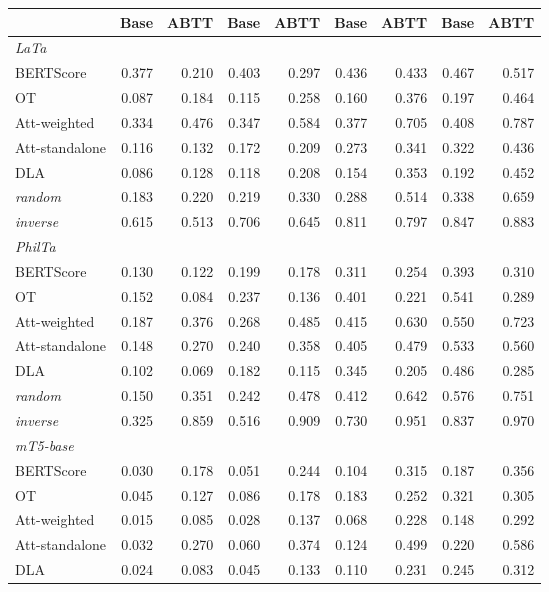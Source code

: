 \begin{table}[t]
\begin{tabular}{lrrrrrrrr}
\cmidrule(lr){2-3} \cmidrule(lr){4-5} \cmidrule(lr){6-7} \cmidrule(lr){8-9}
 & Base & ABTT & Base & ABTT & Base & ABTT & Base & ABTT \\
\midrule
\multicolumn{9}{l}{\emph{LaTa}} \\
BERTScore & 0.377 & 0.210 & 0.403 & 0.297 & 0.436 & 0.433 & 0.467 & 0.517 \\
OT & 0.087 & 0.184 & 0.115 & 0.258 & 0.160 & 0.376 & 0.197 & 0.464 \\
Att-weighted & 0.334 & 0.476 & 0.347 & 0.584 & 0.377 & 0.705 & 0.408 & 0.787 \\
Att-standalone & 0.116 & 0.132 & 0.172 & 0.209 & 0.273 & 0.341 & 0.322 & 0.436 \\
DLA & 0.086 & 0.128 & 0.118 & 0.208 & 0.154 & 0.353 & 0.192 & 0.452 \\
\textit{random} & 0.183 & 0.220 & 0.219 & 0.330 & 0.288 & 0.514 & 0.338 & 0.659 \\
\textit{inverse} & 0.615 & 0.513 & 0.706 & 0.645 & 0.811 & 0.797 & 0.847 & 0.883 \\
\midrule
\multicolumn{9}{l}{\emph{PhilTa}} \\
BERTScore & 0.130 & 0.122 & 0.199 & 0.178 & 0.311 & 0.254 & 0.393 & 0.310 \\
OT & 0.152 & 0.084 & 0.237 & 0.136 & 0.401 & 0.221 & 0.541 & 0.289 \\
Att-weighted & 0.187 & 0.376 & 0.268 & 0.485 & 0.415 & 0.630 & 0.550 & 0.723 \\
Att-standalone & 0.148 & 0.270 & 0.240 & 0.358 & 0.405 & 0.479 & 0.533 & 0.560 \\
DLA & 0.102 & 0.069 & 0.182 & 0.115 & 0.345 & 0.205 & 0.486 & 0.285 \\
\textit{random} & 0.150 & 0.351 & 0.242 & 0.478 & 0.412 & 0.642 & 0.576 & 0.751 \\
\textit{inverse} & 0.325 & 0.859 & 0.516 & 0.909 & 0.730 & 0.951 & 0.837 & 0.970 \\
\midrule
\multicolumn{9}{l}{\emph{mT5-base}} \\
BERTScore & 0.030 & 0.178 & 0.051 & 0.244 & 0.104 & 0.315 & 0.187 & 0.356 \\
OT & 0.045 & 0.127 & 0.086 & 0.178 & 0.183 & 0.252 & 0.321 & 0.305 \\
Att-weighted & 0.015 & 0.085 & 0.028 & 0.137 & 0.068 & 0.228 & 0.148 & 0.292 \\
Att-standalone & 0.032 & 0.270 & 0.060 & 0.374 & 0.124 & 0.499 & 0.220 & 0.586 \\
DLA & 0.024 & 0.083 & 0.045 & 0.133 & 0.110 & 0.231 & 0.245 & 0.312 \\

\end{tabular}
\end{table}
